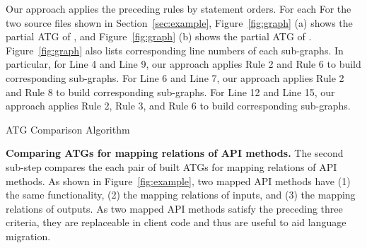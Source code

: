 Our approach applies the preceding rules by statement orders. For
each For the two source files shown in Section~\ref{sec:example},
Figure~\ref{fig:graph} (a) shows the partial ATG of
, and Figure~\ref{fig:graph} (b) shows the
partial ATG of . Figure~\ref{fig:graph} also
lists corresponding line numbers of each sub-graphs. In particular,
for Line 4 and Line 9, our approach applies Rule 2 and Rule 6 to
build corresponding sub-graphs. For Line 6 and Line 7, our approach
applies Rule 2 and Rule 8 to build corresponding sub-graphs. For
Line 12 and Line 15, our approach applies Rule 2, Rule 3, and Rule 6
to build corresponding sub-graphs.
\begin{algorithm}[t]
\begin{SmallOut}
\label{alg:mapATG} \dontprintsemicolon
 \end{SmallOut}
\caption{ATG Comparison Algorithm}
\end{algorithm}

\textbf{Comparing ATGs for mapping relations of API methods.} The
second sub-step compares the each pair of built ATGs for mapping
relations of API methods. As shown in Figure~\ref{fig:example}, two
mapped API methods have (1) the same functionality, (2) the mapping
relations of inputs, and (3) the mapping relations of outputs. As
two mapped API methods satisfy the preceding three criteria, they
are replaceable in client code and thus are useful to aid language
migration.

